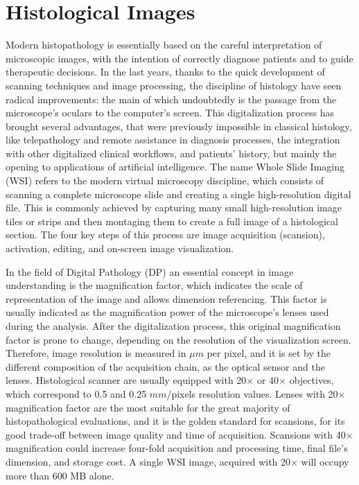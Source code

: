 \section{Histological Images} \label{ssec:hist_im}

Modern histopathology is essentially based on the careful interpretation of microscopic images, with the intention of correctly diagnose patients and to guide therapeutic decisions. In the last years, thanks to the quick development of scanning techniques and image processing, the discipline of histology have seen radical improvements: the main of which undoubtedly is the passage from the microscope's oculars to the computer's screen. This digitalization process has brought several advantages, that were previously impossible in classical histology, like telepathology and remote assistance in diagnosis processes, the integration with other digitalized clinical workflows, and patients' history, but mainly the opening to applications of artificial intelligence.
The name Whole Slide Imaging (WSI) refers to the modern virtual microscopy discipline, which consists of scanning a complete microscope slide and creating a single high-resolution digital file. This is commonly achieved by capturing many small high-resolution image tiles or strips and then montaging them to create a full image of a histological section. The four key steps of this process are image acquisition (scansion), activation, editing, and on-screen image visualization.

In the field of Digital Pathology (DP) an essential concept in image understanding is the magnification factor, which indicates the scale of representation of the image and allows dimension referencing. This factor is usually indicated as the magnification power of the microscope's lenses used during the analysis. After the digitalization process, this original magnification factor is prone to change, depending on the resolution of the visualization screen. Therefore, image resolution is measured in $\mu m$ per pixel, and it is set by the different composition of the acquisition chain, as the optical sensor and the lenses. Histological scanner are usually equipped with 20$\times$ or 40$\times$ objectives, which correspond to 0.5 and 0.25 $mm$/pixels resolution values. Lenses with 20$\times$ magnification factor are the most suitable for the great majority of histopathological evaluations, and it is the golden standard for scansions, for its good trade-off between image quality and time of acquisition. Scansions with 40$\times$ magnification could increase four-fold acquisition and processing time, final file's dimension, and storage cost. A single WSI image, acquired with 20$\times$ will occupy more than 600 MB alone.

